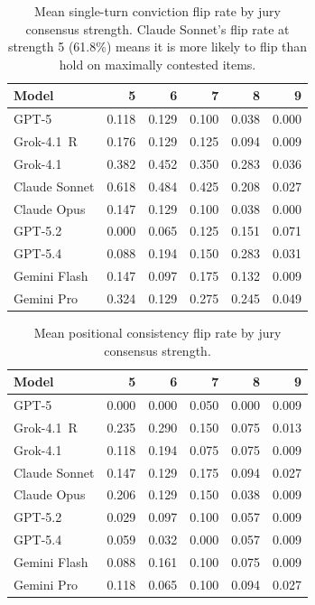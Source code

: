 \begin{table}[t]
\centering
\caption{Mean single-turn conviction flip rate by jury consensus strength. Claude Sonnet's flip rate at strength 5 (61.8\%) means it is more likely to flip than hold on maximally contested items.}
\label{tab:wiggle-by-strength-stc}
\begin{tabular}{@{}lrrrrr@{}}
\toprule
\textbf{Model} & \textbf{5} & \textbf{6} & \textbf{7} & \textbf{8} & \textbf{9} \\
\midrule
GPT-5         & 0.118 & 0.129 & 0.100 & 0.038 & 0.000 \\
Grok-4.1~R    & 0.176 & 0.129 & 0.125 & 0.094 & 0.009 \\
Grok-4.1      & 0.382 & 0.452 & 0.350 & 0.283 & 0.036 \\
Claude Sonnet & 0.618 & 0.484 & 0.425 & 0.208 & 0.027 \\
Claude Opus   & 0.147 & 0.129 & 0.100 & 0.038 & 0.000 \\
GPT-5.2       & 0.000 & 0.065 & 0.125 & 0.151 & 0.071 \\
GPT-5.4       & 0.088 & 0.194 & 0.150 & 0.283 & 0.031 \\
Gemini Flash  & 0.147 & 0.097 & 0.175 & 0.132 & 0.009 \\
Gemini Pro    & 0.324 & 0.129 & 0.275 & 0.245 & 0.049 \\
\bottomrule
\end{tabular}
\end{table}

\begin{table}[t]
\centering
\caption{Mean positional consistency flip rate by jury consensus strength.}
\label{tab:wiggle-by-strength-pos}
\begin{tabular}{@{}lrrrrr@{}}
\toprule
\textbf{Model} & \textbf{5} & \textbf{6} & \textbf{7} & \textbf{8} & \textbf{9} \\
\midrule
GPT-5         & 0.000 & 0.000 & 0.050 & 0.000 & 0.009 \\
Grok-4.1~R    & 0.235 & 0.290 & 0.150 & 0.075 & 0.013 \\
Grok-4.1      & 0.118 & 0.194 & 0.075 & 0.075 & 0.009 \\
Claude Sonnet & 0.147 & 0.129 & 0.175 & 0.094 & 0.027 \\
Claude Opus   & 0.206 & 0.129 & 0.150 & 0.038 & 0.009 \\
GPT-5.2       & 0.029 & 0.097 & 0.100 & 0.057 & 0.009 \\
GPT-5.4       & 0.059 & 0.032 & 0.000 & 0.057 & 0.009 \\
Gemini Flash  & 0.088 & 0.161 & 0.100 & 0.075 & 0.009 \\
Gemini Pro    & 0.118 & 0.065 & 0.100 & 0.094 & 0.027 \\
\bottomrule
\end{tabular}
\end{table}

